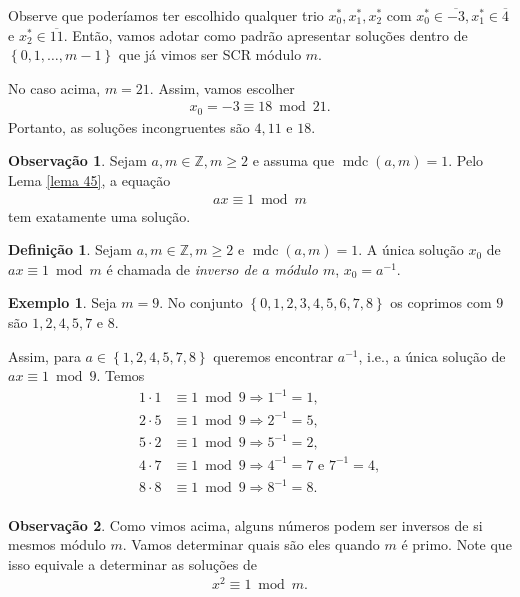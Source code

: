 \documentclass[a4paper,11pt,twoside, leqno]{article}
\DeclareMathOperator{\mdc}{mdc}
\theoremstyle{definition}
\newtheorem*{definition}{Definição}
\newtheorem{remark}{Observação}[section]
\newtheorem*{example}{Exemplo}
\begin{document}
Observe que poderíamos ter escolhido qualquer trio $x_0^\ast, x_1^{\ast}, x_2^\ast$ com $x_0^\ast\in\overline{-3}, x_1^\ast\in\overline{4}$ e $x_2^\ast\in\overline{11}$. Então, vamos adotar como padrão apresentar soluções dentro de $\left\{ 0,1,\dots,m-1 \right\}$ que já vimos ser SCR módulo $m$. 
\par\vspace{0.3cm} No caso acima, $m=21$. Assim, vamos escolher
\begin{align*}
x_0 = -3\equiv 18\bmod 21.
\end{align*}
Portanto, as soluções incongruentes são $4, 11$ e $18$.
\begin{remark}
	Sejam $a,m\in\mathbb{Z}, m\geq 2$ e assuma que $\mdc(a,m) = 1$. Pelo Lema \eqref{lema 45}, a equação
	\begin{align*}
	ax\equiv 1\bmod m
	\end{align*}
	tem exatamente uma solução.
\end{remark}
\begin{definition}
	\label{inverso}
	Sejam $a,m\in\mathbb{Z}, m\geq 2$ e $\mdc(a,m) = 1$. A única solução $x_0$ de $ax\equiv 1\bmod m$ é chamada de {\em inverso de $a$ módulo $m$}, $x_0 = a^{-1}$. 
\end{definition}
\begin{example}
	Seja $m=9$. No conjunto $\left\{ 0,1,2,3,4,5,6,7,8 \right\}$ os coprimos com $9$ são $1,2,4,5,7$ e $8$. 
	\par\vspace{0.3cm} Assim, para $a\in\left\{ 1,2,4,5,7,8 \right\}$ queremos encontrar $a^{-1}$, i.e., a única solução de $ax\equiv 1\bmod 9$. Temos
	\begin{align*}
	1\cdot 1&\equiv 1\bmod 9 \Rightarrow 1^{-1} = 1, \\
	2\cdot 5&\equiv 1\bmod 9 \Rightarrow 2^{-1} = 5, \\
	5\cdot 2&\equiv 1\bmod 9 \Rightarrow 5^{-1} = 2, \\
	4\cdot 7&\equiv 1\bmod 9 \Rightarrow 4^{-1} = 7 \text{ e } 7^{-1} = 4, \\
	8\cdot 8&\equiv 1\bmod 9 \Rightarrow 8^{-1} = 8. \\
	\end{align*}
\end{example}
\begin{remark}
	Como vimos acima, alguns números podem ser inversos de si mesmos módulo $m$. Vamos determinar quais são eles quando $m$ é primo. Note que isso equivale a determinar as soluções de 
	\begin{align*}
	x^2 \equiv 1\bmod m.
	\end{align*}
\end{remark}
\end{document}
